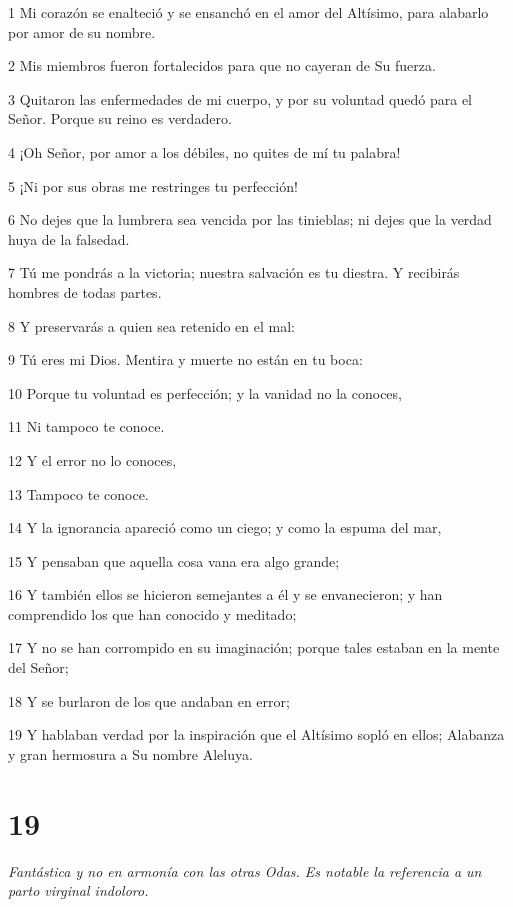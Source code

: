 \par 1 Mi corazón se enalteció y se ensanchó en el amor del Altísimo, para alabarlo por amor de su nombre.
\par 2 Mis miembros fueron fortalecidos para que no cayeran de Su fuerza.
\par 3 Quitaron las enfermedades de mi cuerpo, y por su voluntad quedó para el Señor. Porque su reino es verdadero.
\par 4 ¡Oh Señor, por amor a los débiles, no quites de mí tu palabra!
\par 5 ¡Ni por sus obras me restringes tu perfección!
\par 6 No dejes que la lumbrera sea vencida por las tinieblas; ni dejes que la verdad huya de la falsedad.
\par 7 Tú me pondrás a la victoria; nuestra salvación es tu diestra. Y recibirás hombres de todas partes.
\par 8 Y preservarás a quien sea retenido en el mal:
\par 9 Tú eres mi Dios. Mentira y muerte no están en tu boca:
\par 10 Porque tu voluntad es perfección; y la vanidad no la conoces,
\par 11 Ni tampoco te conoce.
\par 12 Y el error no lo conoces,
\par 13 Tampoco te conoce.
\par 14 Y la ignorancia apareció como un ciego; y como la espuma del mar,
\par 15 Y pensaban que aquella cosa vana era algo grande;
\par 16 Y también ellos se hicieron semejantes a él y se envanecieron; y han comprendido los que han conocido y meditado;
\par 17 Y no se han corrompido en su imaginación; porque tales estaban en la mente del Señor;
\par 18 Y se burlaron de los que andaban en error;
\par 19 Y hablaban verdad por la inspiración que el Altísimo sopló en ellos; Alabanza y gran hermosura a Su nombre Aleluya.

\chapter{19}

\par \textit{Fantástica y no en armonía con las otras Odas. Es notable la referencia a un parto virginal indoloro.}

